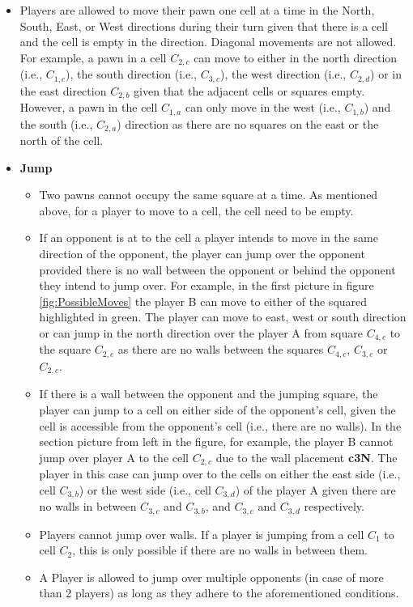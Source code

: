 \begin{itemize}
    \item Players are allowed to move their pawn one cell at a time in the North, South, East, or West directions during their turn given that there is a cell and the cell is empty in the direction. Diagonal movements are not allowed. For example, a pawn in a cell $C_{2, c}$ can move to either in the north direction (i.e., $C_{1, c}$), the south direction (i.e., $C_{3, c}$), the west direction (i.e., $C_{2, d}$) or in the east direction $C_{2, b}$ given that the adjacent cells or squares empty. However, a pawn in the cell $C_{1,a}$ can only move in the west (i.e., $C_{1,b}$) and the south (i.e., $C_{2,a}$) direction as there are no squares on the east or the north of the cell.

    \item \textbf{Jump}
    \begin{itemize}
        \item Two pawns cannot occupy the same square at a time. As mentioned above, for a player to move to a cell, the cell need to be empty. 
        \item If an opponent is at to the cell a player intends to move in the same direction of the opponent, the player can jump over the opponent provided there is no wall between the opponent or behind the opponent they intend to jump over. For example, in the first picture in figure \ref{fig:PossibleMoves} the player B can move to either of the squared highlighted in green. The player can move to east, west or south direction or can jump in the north direction over the player A from square $C_{4,c}$ to the square $C_{2,c}$ as there are no walls between the squares $C_{4,c}$, $C_{3,c}$ or $C_{2,c}$.
        
        \item If there is a wall between the opponent and the jumping square, the player can jump to a cell on either side of the opponent's cell, given the cell is accessible from the opponent's cell (i.e., there are no walls). In the section picture from left in the figure, for example, the player B cannot jump over player A to the cell $C_{2, c}$ due to the wall placement \textbf{c3N}. The player in this case can jump over to the cells on either the east side (i.e., cell $C_{3, b}$) or the west side (i.e., cell $C_{3, d}$) of the player A given there are no walls in between $C_{3, c}$ and $C_{3, b}$, and $C_{3, c}$ and $C_{3, d}$ respectively.
            
        \item Players cannot jump over walls. If a player is jumping from a cell $C_1$ to cell $C_2$, this is only possible if there are no walls in between them.
        \item A Player is allowed to jump over multiple opponents (in case of more than 2 players) as long as they adhere to the aforementioned conditions.
    \end{itemize}
\end{itemize}

